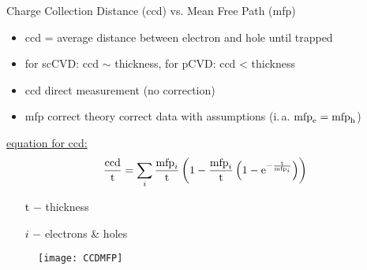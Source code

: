 \begin{frame}{Charge Collection Distance (ccd) vs. Mean Free Path (mfp)}
	
	\begin{itemize}
		\itemfill
		\item ccd = average distance between electron and hole until trapped
		\item for scCVD: ccd $\sim$ thickness, for pCVD: ccd < thickness
		\item ccd direct measurement (no correction)
		\item mfp correct theory \ra correct data with assumptions (i.\,a. $\text{mfp}_{\text{e}}=\text{mfp}_{\text{h}}$)
	\end{itemize}
	
	\begin{minipage}{6cm}
		\underline{equation for ccd:}
		\vspace*{-3pt}
		\begin{equation*}
			\frac{\text{ccd}}{\text{t}} = \sum_i \frac{\text{mfp}_i}{\text{t}}\left(1-\frac{\text{mfp}_i}{\text{t}}\left(1-\text{e}^{-\frac{\text{t}}{\text{mfp}_i}}\right)\right)
		\end{equation*}
		\vspace*{-5pt}
		\begin{itemize}
			\item[\textcolor{black}{t}] $-$ thickness
			\item[\textcolor{black}{$i$}] $-$ electrons \& holes
		\end{itemize}
	\end{minipage}
	\hspace*{2pt}
	\begin{minipage}{5cm}
		\begin{figure}[h]
			\centering
			\texttt{[image: CCDMFP]}
		\end{figure}
	\end{minipage}

\end{frame}
% 
% 	
